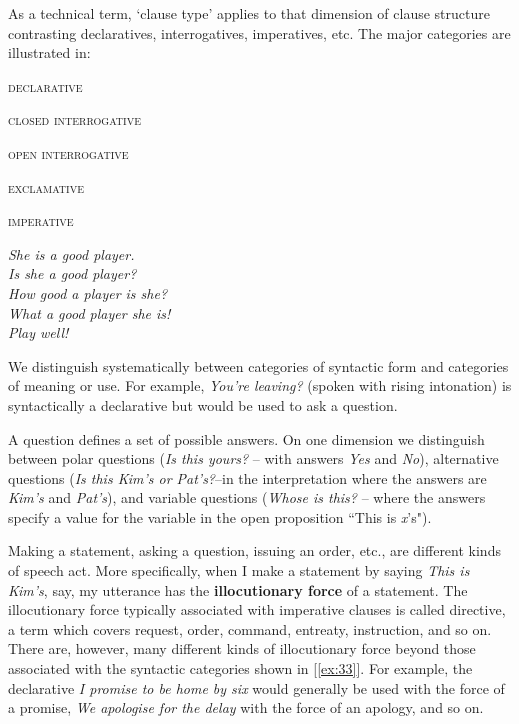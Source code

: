 {As a technical term, `clause type' applies to that dimension of clause structure contrasting declaratives, interrogatives, imperatives, etc. The major categories are illustrated in:}
\begin{examples}
\item \label{ex:33}
\noindent\begin{minipage}[t]{0.5\linewidth}\vspace{-6pt}
    \begin{examples}
        \item \label{ex:33i} \textsc{declarative}
        \item \label{ex:33ii} \textsc{closed interrogative}
        \item \label{ex:33iii} \textsc{open interrogative}
        \item \label{ex:33iv} \textsc{exclamative}
        \item \label{ex:33v} \textsc{imperative}
    \end{examples}
\end{minipage}
\begin{minipage}[t]{0.5\linewidth}
     \textit{She is a good player.}\\
     \textit{Is she a good player?}\\
     \textit{How good a player is she?}\\
     \textit{What a good player she is!}\\
     \textit{Play well!}
\end{minipage}
\end{examples}
We distinguish systematically between categories of syntactic form and categories of meaning or use. For example, \textit{You're leaving?} (spoken with rising intonation) is syntactically a declarative but would be used to ask a question.

A question defines a set of possible answers. On one dimension we distinguish between {polar questions} (\textit{Is this yours?} -- with answers \textit{Yes} and \textit{No}), {alternative questions} (\textit{Is this Kim's or Pat's?}--in the interpretation where the answers are \textit{Kim's} and \textit{Pat's}), and {variable questions} (\textit{Whose is this?} -- where the answers specify a value for the variable in the open proposition ``This is \textit{x}'s").

Making a statement, asking a question, issuing an order, etc., are different kinds of {speech act}. More specifically, when I make a statement by saying \textit{This is Kim's}, say, my utterance has the \textbf{illocutionary force} of a statement. The illocutionary force typically associated with imperative clauses is called {directive}, a term which covers request, order, command, entreaty, instruction, and so on. There are, however, many different kinds of illocutionary force beyond those associated with the syntactic categories shown in [\ref{ex:33}]. For example, the declarative \textit{I promise to be home by six} would generally be used with the force of a promise, \textit{We apologise for the delay} with the force of an apology, and so on.



